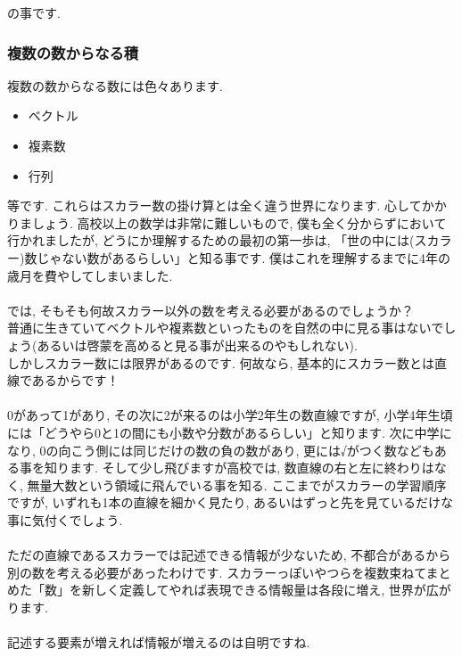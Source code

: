 \documentclass[11pt,a4paper]{jsarticle}
\begin{document}
の事です.
\\

\subsubsection{複数の数からなる積}
複数の数からなる数には色々あります.\\
\begin{itemize}
 \item ベクトル
 \item 複素数
 \item 行列
\end{itemize}

等です. これらはスカラー数の掛け算とは全く違う世界になります. 心してかかりましょう. 高校以上の数学は非常に難しいもので, 僕も全く分からずにおいて行かれましたが, どうにか理解するための最初の第一歩は, 「世の中には(スカラー)数じゃない数があるらしい」と知る事です. 僕はこれを理解するまでに4年の歳月を費やしてしまいました. \\
\\
では, そもそも何故スカラー以外の数を考える必要があるのでしょうか？\\
普通に生きていてベクトルや複素数といったものを自然の中に見る事はないでしょう(あるいは啓蒙を高めると見る事が出来るのやもしれない).\\
しかしスカラー数には限界があるのです. 何故なら, 基本的にスカラー数とは直線であるからです！ \\
\\
0があって1があり, その次に2が来るのは小学2年生の数直線ですが, 小学4年生頃には「どうやら0と1の間にも小数や分数があるらしい」と知ります. 次に中学になり, 0の向こう側には同じだけの数の負の数があり, 更には√がつく数などもある事を知ります. そして少し飛びますが高校では, 数直線の右と左に終わりはなく, 無量大数という領域に飛んでいる事を知る. ここまでがスカラーの学習順序ですが, いずれも1本の直線を細かく見たり, あるいはずっと先を見ているだけな事に気付くでしょう. \\
\\
ただの直線であるスカラーでは記述できる情報が少ないため, 不都合があるから別の数を考える必要があったわけです. スカラーっぽいやつらを複数束ねてまとめた「数」を新しく定義してやれば表現できる情報量は各段に増え, 世界が広がります. \\
\\
記述する要素が増えれば情報が増えるのは自明ですね.
\\
\end{document}
